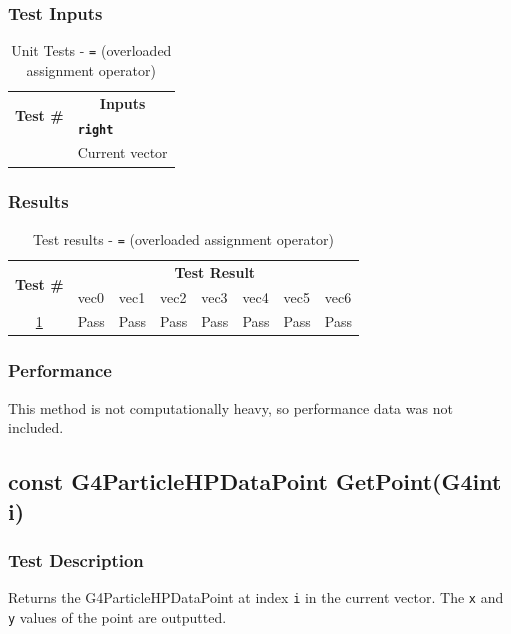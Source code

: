 \documentclass[12pt]{article}
\newcounter{TestCounter}
\begin{document}
	\subsubsection{Test Inputs}
		\begin{table}[H]
		\centering
		\caption{Unit Tests - \texttt{=} (overloaded assignment operator)}\label{OperatorEquals_unit}
		\begin{tabular}{cl}
		\toprule
		\multirow{2}{*}{\bf Test \#}  & \multicolumn{1}{c}{\bf Inputs}\\
		& \bf \texttt{right}\\\midrule
		{TestCounter}\arabic{TestCounter}\label{OperatorEquals_0} & Current vector\\
		\bottomrule
		\end{tabular}
		\end{table}
	\subsubsection{Results}
		\begin{table}[h]
		\centering
		\caption{Test results - \texttt{=} (overloaded assignment operator)}\label{OperatorEquals_acc}
		\begin{tabular}{clllllll}
		\toprule
		\multirow{2}{*}{\bf Test \#} & \multicolumn{7}{c}{\bf Test Result}\\
		& vec0 & vec1 & vec2 & vec3 & vec4 & vec5 & vec6\\\midrule
		\ref{OperatorEquals_0} & Pass & Pass & Pass & Pass & Pass & Pass & Pass\\
		\bottomrule
		\end{tabular}
		\end{table}
	\subsubsection{Performance}	
		This method is not computationally heavy, so performance data was not included.
		
\subsection{const G4ParticleHPDataPoint GetPoint(G4int i)}
	\subsubsection{Test Description}
	Returns the G4ParticleHPDataPoint at index \texttt{i} in the current vector. The \texttt{x} 
	and \texttt{y} values of the point are outputted.
	
\end{document}

